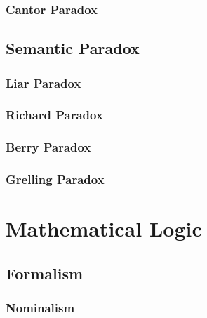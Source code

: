 \subsubsection{Cantor Paradox}\label{sec:cantor_paradox}



\subsection{Semantic Paradox}\label{sec:semantic_paradox}

\subsubsection{Liar Paradox}\label{sec:liar_paradox}

\subsubsection{Richard Paradox}\label{sec:richard_paradox}

\subsubsection{Berry Paradox}\label{sec:berry_paradox}

\subsubsection{Grelling Paradox}\label{sec:grelling_paradox}



\section{Mathematical Logic}\label{sec:mathematical_logic}
\cite{curry77}

\subsection{Formalism}\label{sec:formalism}

\subsubsection{Nominalism}\label{sec:nominalism}



